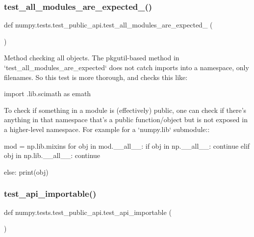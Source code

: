 \subsubsection{\texorpdfstring{test\+\_\+all\+\_\+modules\+\_\+are\+\_\+expected\+\_()}{test\_all\_modules\_are\_expected\_2()}}
{\footnotesize\ttfamily def numpy.\+tests.\+test\+\_\+public\+\_\+api.\+test\+\_\+all\+\_\+modules\+\_\+are\+\_\+expected\+\_ (\begin{DoxyParamCaption}{ }\end{DoxyParamCaption})}

\begin{DoxyVerb}Method checking all objects. The pkgutil-based method in
`test_all_modules_are_expected` does not catch imports into a namespace,
only filenames.  So this test is more thorough, and checks this like:

    import .lib.scimath as emath

To check if something in a module is (effectively) public, one can check if
there's anything in that namespace that's a public function/object but is
not exposed in a higher-level namespace.  For example for a `numpy.lib`
submodule::

    mod = np.lib.mixins
    for obj in mod.__all__:
        if obj in np.__all__:
            continue
        elif obj in np.lib.__all__:
            continue

        else:
            print(obj)\end{DoxyVerb}
 \mbox{\label{namespacenumpy_1_1tests_1_1test__public__api_a8d3ac02fa4390cfdd0099d874c7bd74f}} 
\subsubsection{\texorpdfstring{test\+\_\+api\+\_\+importable()}{test\_api\_importable()}}
{\footnotesize\ttfamily def numpy.\+tests.\+test\+\_\+public\+\_\+api.\+test\+\_\+api\+\_\+importable (\begin{DoxyParamCaption}{ }\end{DoxyParamCaption})}

